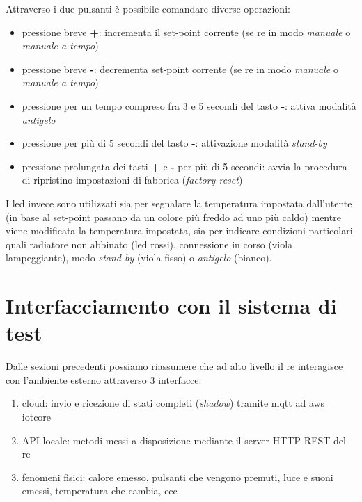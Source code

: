 \documentclass[12pt,a4paper,twoside,titlepage]{book}
\begin{document}
Attraverso i due pulsanti è possibile comandare diverse operazioni:

\begin{itemize}
    \item pressione breve \textbf{+}: incrementa il set-point corrente (se \acrshort{re} in modo \textit{manuale} o \textit{manuale a tempo})
    \item pressione breve \textbf{-}: decrementa set-point corrente (se \acrshort{re} in modo \textit{manuale} o \textit{manuale a tempo})
    \item pressione per un tempo compreso fra 3 e 5 secondi del tasto \textbf{-}: attiva modalità \textit{antigelo}
    \item pressione per più di 5 secondi del tasto \textbf{-}: attivazione modalità \textit{stand-by}
    \item pressione prolungata dei tasti \textbf{+} e \textbf{-} per più di 5 secondi: avvia la procedura di ripristino impostazioni 
        di fabbrica (\textit{factory reset})
\end{itemize}

I \acrshort{led} invece sono utilizzati sia per segnalare la temperatura impostata dall'utente
(in base al set-point passano da un colore più freddo ad uno più caldo) mentre viene modificata la 
temperatura impostata, sia per indicare condizioni particolari quali radiatore non abbinato (\acrshort{led} rossi), connessione
in corso (viola lampeggiante), modo \textit{stand-by} (viola fisso) o \textit{antigelo} (bianco).

\section{Interfacciamento con il sistema di test}

Dalle sezioni precedenti possiamo riassumere che ad alto livello il \acrshort{re} interagisce con 
l'ambiente esterno attraverso 3 interfacce:

\begin{enumerate}
    \item \gls{cloud}: invio e ricezione di stati completi (\textit{shadow}) tramite \Gls{mqtt} ad \acrshort{aws} \Gls{iotcore}
    \item API locale: metodi messi a disposizione mediante il server HTTP REST del \acrshort{re}
    \item fenomeni fisici: calore emesso, pulsanti che vengono premuti, luce e suoni emessi, temperatura che cambia, ecc
\end{enumerate}
\end{document}
